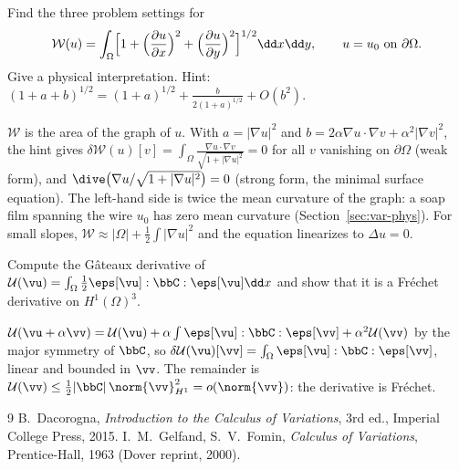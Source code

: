 \label{exo:A-minimal}
Find the three problem settings for
\[
  \mathcal W(u)=\int_\Omega\Bigl[1+\Bigl(\frac{\partial u}{\partial x}\Bigr)^2
  +\Bigl(\frac{\partial u}{\partial y}\Bigr)^2\Bigr]^{1/2}\dd x\dd y,
  \qquad u=u_0\ \text{on }\partial\Omega .
\]
Give a physical interpretation. Hint:
$(1+a+b)^{1/2}=(1+a)^{1/2}+\frac{b}{2(1+a)^{1/2}}+O(b^2)$.
\begin{solution}
$\mathcal W$ is the area of the graph of $u$. With
$a=|\nabla u|^2$ and $b=2\alpha\nabla u\cdot\nabla v+\alpha^2|\nabla v|^2$, the hint
gives
$\delta\mathcal W(u)[v]=\int_\Omega\frac{\nabla u\cdot\nabla v}{\sqrt{1+|\nabla u|^2}}=0$
for all $v$ vanishing on $\partial\Omega$ (weak form), and
$\dive\bigl(\nabla u/\sqrt{1+|\nabla u|^2}\bigr)=0$ (strong form, the minimal
surface equation). The left-hand side is twice the mean curvature of the
graph: a soap film spanning the wire $u_0$ has zero mean curvature
(Section~\ref{sec:var-phys}). For small slopes, $\mathcal W\approx|\Omega|+\tfrac12\int|\nabla u|^2$
and the equation linearizes to $\Delta u=0$.
\end{solution}

\label{exo:A-elastic}
Compute the G\^ateaux derivative of
$\mathcal U(\vu)=\int_\Omega\tfrac12\eps[\vu]:\bbC:\eps[\vu]\dd x$ and show that
it is a Fr\'echet derivative on $H^1(\Omega)^3$.
\begin{solution}
$\mathcal U(\vu+\alpha\vv)=\mathcal U(\vu)+\alpha\int\eps[\vu]:\bbC:\eps[\vv]+\alpha^2\mathcal U(\vv)$
by the major symmetry of $\bbC$, so
$\delta\mathcal U(\vu)[\vv]=\int_\Omega\eps[\vu]:\bbC:\eps[\vv]$, linear and bounded
in $\vv$. The remainder is $\mathcal U(\vv)\le\tfrac12|\bbC|\,\norm{\vv}_{H^1}^2=o(\norm{\vv})$:
the derivative is Fr\'echet.
\end{solution}

\begin{chapterbib}{9}
 B.~Dacorogna, \emph{Introduction to the Calculus of Variations}, 3rd ed., Imperial College Press, 2015.
 I.~M.~Gelfand, S.~V.~Fomin, \emph{Calculus of Variations}, Prentice-Hall, 1963 (Dover reprint, 2000).
\end{chapterbib}
